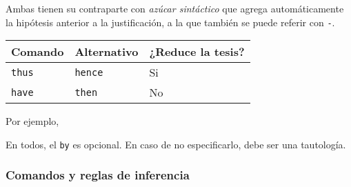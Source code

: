 Ambas tienen su contraparte con \textit{azúcar sintáctico} que agrega
automáticamente la hipótesis anterior a la justificación, a la que también se
puede referir con \texttt{-}.

\begin{table}[H]
    \centering
\begin{tabular}{l|l|l}
Comando             & Alternativo             & ¿Reduce la tesis? \\
\hline
\lstinline|thus|    & \lstinline|hence|       & Si               \\
\lstinline|have|    & \lstinline|then|        & No              
\end{tabular}
\end{table}

Por ejemplo, 
\begin{multicols}{2}
    
    \vfill\null
    \columnbreak
    
\end{multicols}


En todos, el \lstinline{by} es opcional. En caso de no especificarlo, debe ser
una tautología.



\subsubsection{Comandos y reglas de inferencia}


